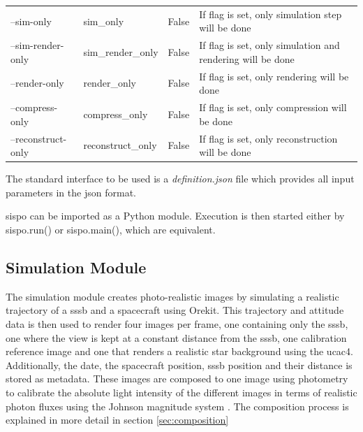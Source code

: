 \begin{table}[htpb]
\begin{tabular}{p{}|p{}|p{}|p{}}
\multicolumn{1}{l|}{--sim-only}          & sim\_only              & False                      & If flag is set, only simulation step will be done                                                                         \\
\multicolumn{1}{l|}{--sim-render-only}   & sim\_render\_only      & False                      & If flag is set, only simulation and rendering will be done                                                                \\
\multicolumn{1}{l|}{--render-only}       & render\_only           & False                      & If flag is set, only rendering will be done                                                                               \\
\multicolumn{1}{l|}{--compress-only}     & compress\_only         & False                      & If flag is set, only compression will be done                                                                             \\
\multicolumn{1}{l|}{--reconstruct-only}  & reconstruct\_only      & False                      & If flag is set, only reconstruction will be done                                                                         

\end{tabular}
\label{tab:cli_args}
\end{table}

The standard interface to be used is a \textit{definition.json} file which provides all input parameters in the \gls{json} format.

\gls{sispo} can be imported as a Python module. Execution is then started either by sispo.run() or sispo.main(), which are equivalent.

\subsection{Simulation Module}
The simulation module creates photo-realistic images by simulating a realistic trajectory of a \gls{sssb} and a spacecraft using Orekit. This trajectory and attitude data is then used to render four images per frame, one containing only the \gls{sssb}, one where the view is kept at a constant distance from the \gls{sssb}, one calibration reference image and one that renders a realistic star background using the \gls{ucac4}. Additionally, the date, the spacecraft position, \gls{sssb} position and their distance is stored as metadata. These images are composed to one image using photometry to calibrate the absolute light intensity of the different images in terms of realistic photon fluxes using the Johnson magnitude system \cite{bessel1979ubvri}. The composition process is explained in more detail in section \ref{sec:composition}

